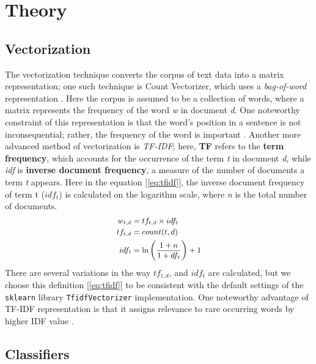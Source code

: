 \documentclass[11pt]{article}
\begin{document}
 \section{Theory}
\subsection{Vectorization}
The vectorization technique converts the corpus of text data into a matrix representation; one such technique is Count Vectorizer, which uses a \textit{bag-of-word} representation \cite{jurafsky}. Here the corpus is assumed to be a collection of words, where a matrix represents the frequency of the word \textit{w} in document \textit{d}. One noteworthy constraint of this representation is that the word's position in a sentence is not inconsequential; rather, the frequency of the word is important \cite{jurafsky}. 
Another more advanced method of vectorization is \textit{TF-IDF}; here, \textbf{TF} refers to the \textbf{term frequency}, which accounts for the occurrence of the term \textit{t} in document \textit{d}, while \textit{idf} is \textbf{inverse document frequency}, a measure of the number of documents a term \textit{t} appears. Here in the equation [\ref{eq:tfidf}], the inverse document frequency of term t ($idf_t$) is calculated on the logarithm scale, where \textit{n} is the total number of documents.
\begin{equation}
\label{eq:tfidf}
\small
\begin{aligned}
w_{t,d}&=tf_{t,d} \times idf_{t}\\
tf_{t,d}&=count(t,d)\\
idf_{t}&=\ln \left(\frac{1+n}{1+ df_t}\right)+1   
\end{aligned}    
\end{equation}
There are several variations in the way $tf_{t,d}$, and $idf_t$ are calculated, but we choose this definition [\ref{eq:tfidf}] to be consistent with the default settings of the \texttt{sklearn} library \texttt{TfidfVectorizer} implementation. One noteworthy advantage of TF-IDF representation is that it assigns relevance to rare occurring words by higher IDF value \cite{info-ret}.

\subsection{Classifiers}
\end{document}
